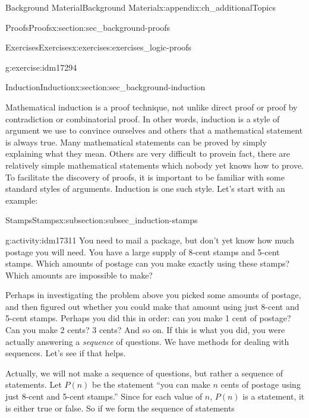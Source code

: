 \documentclass[oneside,10pt,]{book}
\numberwithin{equation}{chapter}
\begin{document}
\begin{appendixptx}{Background Material}{}{Background Material}{}{}{x:appendix:ch_additionalTopics}
\begin{sectionptx}{Proofs}{}{Proofs}{}{}{x:section:sec_background-proofs}
\begin{exercises-subsection}{Exercises}{}{Exercises}{}{}{x:exercises:exercises_logic-proofs}
\begin{divisionexercise}{20}{}{}{g:exercise:idm17294}
\begin{sidebyside}{1}{0.4}{0.4}{0}
\end{sidebyside}%
\end{divisionexercise}%
\end{exercises-subsection}
\end{sectionptx}
%
%
\typeout{************************************************}
\typeout{************************************************}
%
\begin{sectionptx}{Induction}{}{Induction}{}{}{x:section:sec_background-induction}
\begin{introduction}{}%
 Mathematical induction is a proof technique, not unlike direct proof or proof by contradiction or combinatorial proof. In other words, induction is a style of argument we use to convince ourselves and others that a mathematical statement is always true. Many mathematical statements can be proved by simply explaining what they mean. Others are very difficult to prove\textemdash{}in fact, there are relatively simple mathematical statements which nobody yet knows how to prove. To facilitate the discovery of proofs, it is important to be familiar with some standard styles of arguments. Induction is one such style. Let's start with an example:%
\end{introduction}%
%
%
\typeout{************************************************}
\typeout{************************************************}
%
\begin{subsectionptx}{Stamps}{}{Stamps}{}{}{x:subsection:subsec_induction-stamps}
\begin{activity}{}{g:activity:idm17311}%
You need to mail a package, but don't yet know how much postage you will need. You have a large supply of 8-cent stamps and 5-cent stamps. Which amounts of postage can you make exactly using these stamps? Which amounts are impossible to make?%
\end{activity}
Perhaps in investigating the problem above you picked some amounts of postage, and then figured out whether you could make that amount using just 8-cent and 5-cent stamps. Perhaps you did this in order: can you make 1 cent of postage? Can you make 2 cents? 3 cents? And so on. If this is what you did, you were actually answering a \emph{sequence} of questions. We have methods for dealing with sequences. Let's see if that helps.%
\par
Actually, we will not make a sequence of questions, but rather a sequence of statements. Let \(P(n)\)\label{g:notation:idm17317} be the statement ``you can make \(n\) cents of postage using just 8-cent and 5-cent stamps.'' Since for each value of \(n\), \(P(n)\) is a statement, it is either true or false. So if we form the sequence of statements%

\end{subsectionptx}
\end{sectionptx}
\end{appendixptx}
\end{document}
